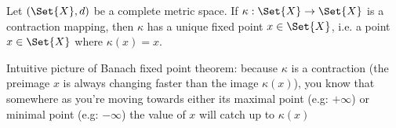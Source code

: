 \begin{thm}
  Let $(\Set{X}, d)$ be a complete metric space. If $\kappa: \Set{X} \rightarrow \Set{X}$ is a contraction mapping, then $\kappa$ has a unique fixed point $x \in \Set{X}$, i.e. a point $x \in \Set{X}$ where $\kappa(x) = x$.
\end{thm}

\begin{rem}
  Intuitive picture of Banach fixed point theorem: because $\kappa$ is a contraction (the preimage $x$ is always changing faster than the image $\kappa(x)$), you know that somewhere as you're moving towards either its maximal point (e.g: $+\infty$) or minimal point (e.g: $-\infty$) the value of $x$ will catch up to $\kappa(x)$
\end{rem}

